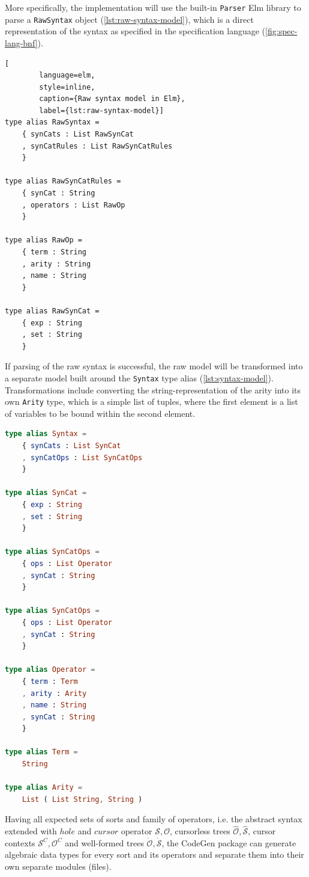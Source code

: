 More specifically, the implementation will use the built-in \texttt{Parser} Elm
library to parse a \texttt{RawSyntax} object (\cref{lst:raw-syntax-model}),
which is a direct representation of the syntax as specified in the specification
language (\cref{fig:spec-lang-bnf}).

\begin{lstlisting}[
        language=elm,
        style=inline,
        caption={Raw syntax model in Elm},
        label={lst:raw-syntax-model}]
type alias RawSyntax =
    { synCats : List RawSynCat
    , synCatRules : List RawSynCatRules
    }

type alias RawSynCatRules =
    { synCat : String
    , operators : List RawOp
    }

type alias RawOp =
    { term : String
    , arity : String
    , name : String
    }

type alias RawSynCat =
    { exp : String
    , set : String
    }
\end{lstlisting}

If parsing of the raw syntax is successful, the raw model will
be transformed into a separate model built around the \texttt{Syntax}
type alias (\cref{lst:syntax-model}).
Transformations include converting the string-representation of the arity
into its own \texttt{Arity} type, which is a simple list of tuples,
where the first element is a list of variables to be bound within the second element.

\begin{lstlisting}[language=elm,style=inline,caption={Syntax model},label={lst:syntax-model}]
type alias Syntax =
    { synCats : List SynCat
    , synCatOps : List SynCatOps
    }

type alias SynCat =
    { exp : String
    , set : String
    }

type alias SynCatOps =
    { ops : List Operator
    , synCat : String
    }

type alias SynCatOps =
    { ops : List Operator
    , synCat : String
    }

type alias Operator =
    { term : Term
    , arity : Arity
    , name : String
    , synCat : String
    }

type alias Term =
    String

type alias Arity =
    List ( List String, String )
\end{lstlisting}

Having all expected sets of sorts and family of operators,
i.e. the abstract syntax extended with $hole$ and $cursor$ operator $\mathcal{S},
  \mathcal{O}$, cursorless trees $\hat{\mathcal{O}},\hat{\mathcal{S}}$,
cursor contexts $\mathcal{S}^C,\mathcal{O}^C$ and
well-formed trees $\dot{\mathcal{O}},\dot{\mathcal{S}}$,
the CodeGen package can generate algebraic data types for every sort and its operators
and separate them into their own separate modules (files).

